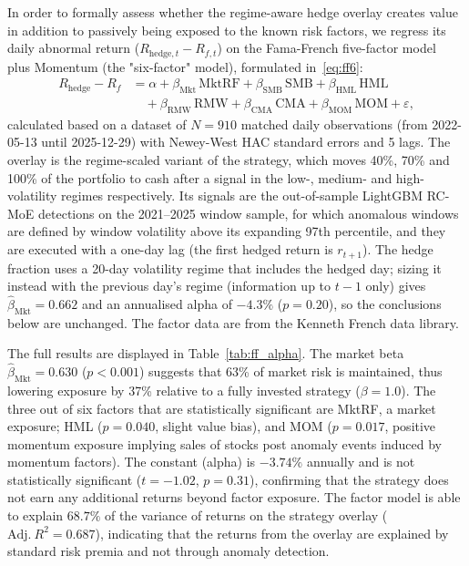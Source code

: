 \documentclass[]{interact}
\begin{document}
In order to formally assess whether the regime-aware hedge overlay creates value in addition to passively being exposed to the known risk factors, we regress its daily abnormal return ($R_{\text{hedge},t} - R_{f,t}$) on the Fama-French five-factor model~\citep{fama2015five} plus Momentum (the "six-factor" model), formulated in~\eqref{eq:ff6}:
\begin{equation}
\begin{split}
  R_{\text{hedge}} - R_f &= \alpha + \beta_{\text{Mkt}}\,\mathrm{MktRF} + \beta_{\text{SMB}}\,\mathrm{SMB} + \beta_{\text{HML}}\,\mathrm{HML} \\
  &\quad + \beta_{\text{RMW}}\,\mathrm{RMW} + \beta_{\text{CMA}}\,\mathrm{CMA} + \beta_{\text{MOM}}\,\mathrm{MOM} + \varepsilon,
\end{split}
\label{eq:ff6}
\end{equation}
calculated based on a dataset of $N=910$ matched daily observations (from 2022-05-13 until 2025-12-29) with Newey-West HAC standard errors and 5 lags. The overlay is the regime-scaled variant of the strategy, which moves 40\%, 70\% and 100\% of the portfolio to cash after a signal in the low-, medium- and high-volatility regimes respectively. Its signals are the out-of-sample LightGBM RC-MoE detections on the 2021--2025 window sample, for which anomalous windows are defined by window volatility above its expanding 97th percentile, and they are executed with a one-day lag (the first hedged return is $r_{t+1}$). The hedge fraction uses a 20-day volatility regime that includes the hedged day; sizing it instead with the previous day's regime (information up to $t-1$ only) gives $\hat{\beta}_{\text{Mkt}}=0.662$ and an annualised alpha of $-4.3\%$ ($p=0.20$), so the conclusions below are unchanged. The factor data are from the Kenneth French data library.

The full results are displayed in Table~\ref{tab:ff_alpha}. The market beta $\hat{\beta}_{\text{Mkt}}=0.630$ ($p < 0.001$) suggests that 63\% of market risk is maintained, thus lowering exposure by 37\% relative to a fully invested strategy ($\beta = 1.0$). The three out of six factors that are statistically significant are MktRF, a market exposure; HML ($p=0.040$, slight value bias), and MOM ($p=0.017$, positive momentum exposure implying sales of stocks post anomaly events induced by momentum factors). The constant (alpha) is $-3.74\%$ annually and is not statistically significant ($t=-1.02$, $p=0.31$), confirming that the strategy does not earn any additional returns beyond factor exposure. The factor model is able to explain $68.7\%$ of the variance of returns on the strategy overlay ($\mathrm{Adj.}\ R^2=0.687$), indicating that the returns from the overlay are explained by standard risk premia and not through anomaly detection.
\end{document}
